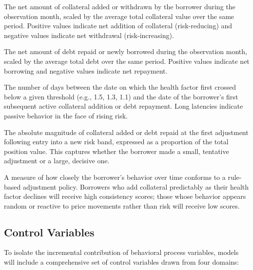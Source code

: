 \begin{description}[leftmargin=*,labelindent=\parindent, itemindent=0pt]
\item[Active Collateral Adjustment Rate.] The net amount of collateral added or withdrawn by the borrower during the observation month, scaled by the average total collateral value over the same period. Positive values indicate net addition of collateral (risk-reducing) and negative values indicate net withdrawal (risk-increasing).

\item[Active Debt Management Rate.] The net amount of debt repaid or newly borrowed during the observation month, scaled by the average total debt over the same period. Positive values indicate net borrowing and negative values indicate net repayment.

\item[Response Latency.] The number of days between the date on which the health factor first crossed below a given threshold (e.g., 1.5, 1.3, 1.1) and the date of the borrower's first subsequent active collateral addition or debt repayment. Long latencies indicate passive behavior in the face of rising risk.

\item[Adjustment Intensity.] The absolute magnitude of collateral added or debt repaid at the first adjustment following entry into a new risk band, expressed as a proportion of the total position value. This captures whether the borrower made a small, tentative adjustment or a large, decisive one.

\item[Behavioral Consistency.] A measure of how closely the borrower's behavior over time conforms to a rule-based adjustment policy. Borrowers who add collateral predictably as their health factor declines will receive high consistency scores; those whose behavior appears random or reactive to price movements rather than risk will receive low scores.
\end{description}

\subsection{Control Variables}

To isolate the incremental contribution of behavioral process variables, models will include a comprehensive set of control variables drawn from four domains:

